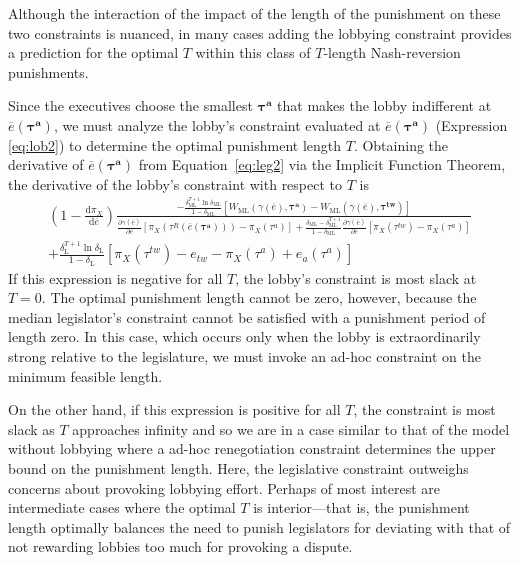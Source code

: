 \documentclass[authoryear, review]{elsarticle}
\newcommand{\ov}{\overline}
\newcommand{\bta}{\bm{\tau^a}}
\newcommand{\ga}{\gamma}
\newcommand{\btw}{\bm{\tau^{tw}}}
\newcommand{\de}{\delta}
\begin{document}
Although the interaction of the impact of the length of the punishment on these two constraints is nuanced, in many cases adding the lobbying constraint provides a prediction for the optimal $T$ within this class of $T$-length Nash-reversion punishments.

Since the executives choose the smallest $\bta$ that makes the lobby indifferent at $\ov{e}(\bta)$, we must analyze the lobby's constraint evaluated at $\ov{e}(\bta)$ (Expression \ref{eq:lob2}) to determine the optimal punishment length $T$. Obtaining the derivative of $\ov{e}(\bta)$ from Equation~\ref{eq:leg2} via the Implicit Function Theorem, the derivative of the lobby's constraint with respect to $T$ is
\begin{multline}
 	\left(1 - \frac{\mathrm{d} \pi_X}{\mathrm{d} \ov{e}} \right) \frac{ -\frac{\de_\text{ML}^{T+1}\ln\de_\text{ML}}{1-\de_\text{ML}}\left[  W_\text{ML}(\ga(\ov{e}),\bta) - W_\text{ML}(\ga(\ov{e}),\btw) \right]}{\frac{\partial \ga(\ov{e})}{\partial e} \left[ \pi_X(\tau^R(\ov{e}(\bta))) - \pi_X(\tau^a) \right] + \frac{\de_\text{ML} - \de_\text{ML}^{T+1}}{1-\de_\text{ML}}\frac{\partial \ga(\ov{e})}{\partial e} \left[ \pi_X(\tau^{tw}) - \pi_X(\tau^a) \right]} \\
	+  \frac{\de_\text{L}^{T+1} \ln \de_\text{L}}{1-\de_\text{L}} \left[ \pi_X(\tau^{tw}) - e_{tw} -\pi_X(\tau^a) + e_a(\tau^a) \right]
 	\label{ine:T}
\end{multline}
If this expression is negative for all $T$, the lobby's constraint is most slack at $T=0$. The optimal punishment length cannot be zero, however, because the median legislator's constraint cannot be satisfied with a punishment period of length zero. In this case, which occurs only when the lobby is extraordinarily strong relative to the legislature, we must invoke an ad-hoc constraint on the minimum feasible length.

On the other hand, if this expression is positive for all $T$, the constraint is most slack as $T$ approaches infinity and so we are in a case similar to that of the model without lobbying where a ad-hoc renegotiation constraint determines the upper bound on the punishment length. Here, the legislative constraint outweighs concerns about provoking lobbying effort. Perhaps of most interest are intermediate cases where the optimal $T$ is interior---that is, the punishment length optimally balances the need to punish legislators for deviating with that of not rewarding lobbies too much for provoking a dispute.
\end{document}
